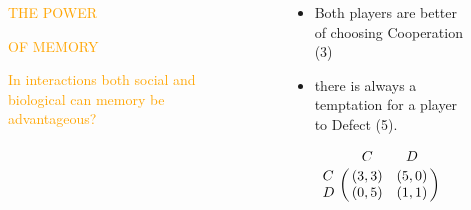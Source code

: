 \documentclass[usenames,dvipsnames,t]{beamer}
\begin{document}
\begin{columns}
    \begin{column}{.025\linewidth}
    \end{column}
    \begin{column}{.5\linewidth}
        \vspace{0.7cm}

        \centering
        \textcolor{orange}{\fontsize{180}{400} \selectfont THE POWER}
        \vspace{0.6cm}

        \textcolor{orange}{\fontsize{180}{400} \selectfont OF MEMORY}
        \vspace{0.6cm}

        \Large\textcolor{orange}{In interactions both social and biological can memory
        be advantageous?}
    \end{column}
    \begin{column}{.025\linewidth}
    \end{column}
    \vrule width 10pt

    \begin{column}{.025\linewidth}
    \end{column}

    \begin{column}{.4\linewidth}
        \vspace{2cm}

    \begin{itemize}
        \item Both players are better of choosing Cooperation (3)
        \item there is always a temptation for a player to Defect (5).
    \end{itemize}

        \large{
        \begin{equation}\label{eq:payoff_matrix_symb}
             \bordermatrix{~ & C & D \cr
                              C & (3, 3) & (5, 0) \cr
                              D & (0, 5) & (1, 1) \cr}
            \end{equation}
        }
    \end{column}

    \begin{column}{.025\linewidth}
    \end{column}
\end{columns}
\end{document}
